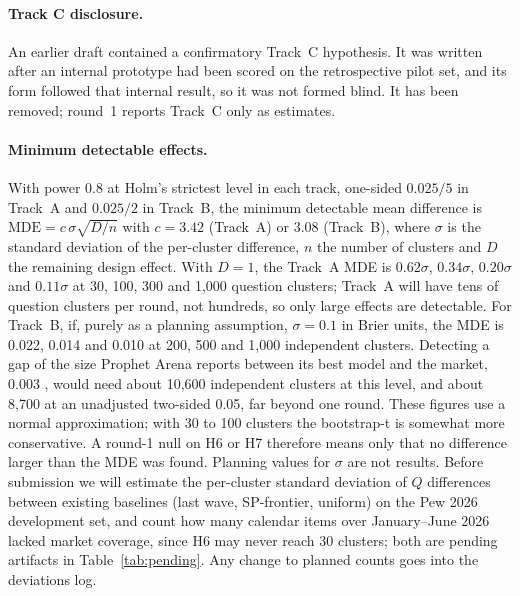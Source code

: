 \documentclass[11pt]{article}
\begin{document}
\paragraph{Track C disclosure.} An earlier draft contained a confirmatory Track~C hypothesis. It was written after an internal prototype had been scored on the retrospective pilot set, and its form followed that internal result, so it was not formed blind. It has been removed; round~1 reports Track~C only as estimates.

\paragraph{Minimum detectable effects.} With power 0.8 at Holm's strictest level in each track, one-sided $0.025/5$ in Track~A and $0.025/2$ in Track~B, the minimum detectable mean difference is $\mathrm{MDE} = c\,\sigma\sqrt{D/n}$ with $c = 3.42$ (Track~A) or $3.08$ (Track~B), where $\sigma$ is the standard deviation of the per-cluster difference, $n$ the number of clusters and $D$ the remaining design effect. With $D=1$, the Track~A MDE is $0.62\sigma$, $0.34\sigma$, $0.20\sigma$ and $0.11\sigma$ at 30, 100, 300 and 1{,}000 question clusters; Track~A will have tens of question clusters per round, not hundreds, so only large effects are detectable. For Track~B, if, purely as a planning assumption, $\sigma = 0.1$ in Brier units, the MDE is 0.022, 0.014 and 0.010 at 200, 500 and 1{,}000 independent clusters. Detecting a gap of the size Prophet Arena reports between its best model and the market, 0.003 \citep{yang2025prophet}, would need about 10{,}600 independent clusters at this level, and about 8{,}700 at an unadjusted two-sided 0.05, far beyond one round. These figures use a normal approximation; with 30 to 100 clusters the bootstrap-t is somewhat more conservative. A round-1 null on H6 or H7 therefore means only that no difference larger than the MDE was found. Planning values for $\sigma$ are not results. Before submission we will estimate the per-cluster standard deviation of $Q$ differences between existing baselines (last wave, SP-frontier, uniform) on the Pew 2026 development set, and count how many calendar items over January--June 2026 lacked market coverage, since H6 may never reach 30 clusters; both are pending artifacts in Table~\ref{tab:pending}. Any change to planned counts goes into the deviations log.
\end{document}
